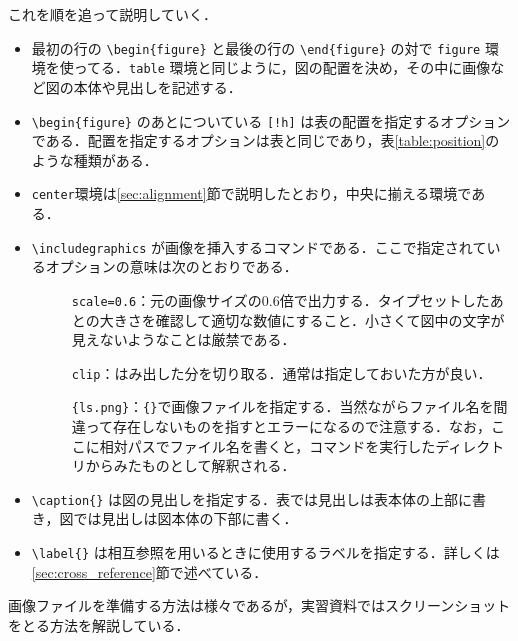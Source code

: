 これを順を追って説明していく．
\begin{itemize}
    \item 最初の行の \verb|\begin{figure}| と最後の行の \verb|\end{figure}| の対で \verb|figure| 環境を使ってる．\verb|table| 環境と同じように，図の配置を決め，その中に画像など図の本体や見出しを記述する．

    \item \verb|\begin{figure}| のあとについている \verb|[!h]| は表の配置を指定するオプションである．配置を指定するオプションは表と同じであり，表\ref{table:position}のような種類がある．
    \item \verb|center|環境は\ref{sec:alignment}節で説明したとおり，中央に揃える環境である．
    \item \verb|\includegraphics| が画像を挿入するコマンドである．ここで指定されているオプションの意味は次のとおりである．
    \begin{description}
        \item[] \verb+scale=0.6+：元の画像サイズの0.6倍で出力する．タイプセットしたあとの大きさを確認して適切な数値にすること．小さくて図中の文字が見えないようなことは厳禁である．
        \item[] \verb+clip+：はみ出した分を切り取る．通常は指定しておいた方が良い．
        \item[] \verb+{ls.png}+：\verb+{}+で画像ファイルを指定する．当然ながらファイル名を間違って存在しないものを指すとエラーになるので注意する．なお，ここに相対パスでファイル名を書くと，コマンドを実行したディレクトリからみたものとして解釈される．
    \end{description}
    \item \verb|\caption{}| は図の見出しを指定する．表では見出しは表本体の上部に書き，図では見出しは図本体の下部に書く．
    \item \verb|\label{}| は相互参照を用いるときに使用するラベルを指定する．詳しくは\ref{sec:cross_reference}節で述べている．
\end{itemize}
画像ファイルを準備する方法は様々であるが，実習資料ではスクリーンショットをとる方法を解説している．

